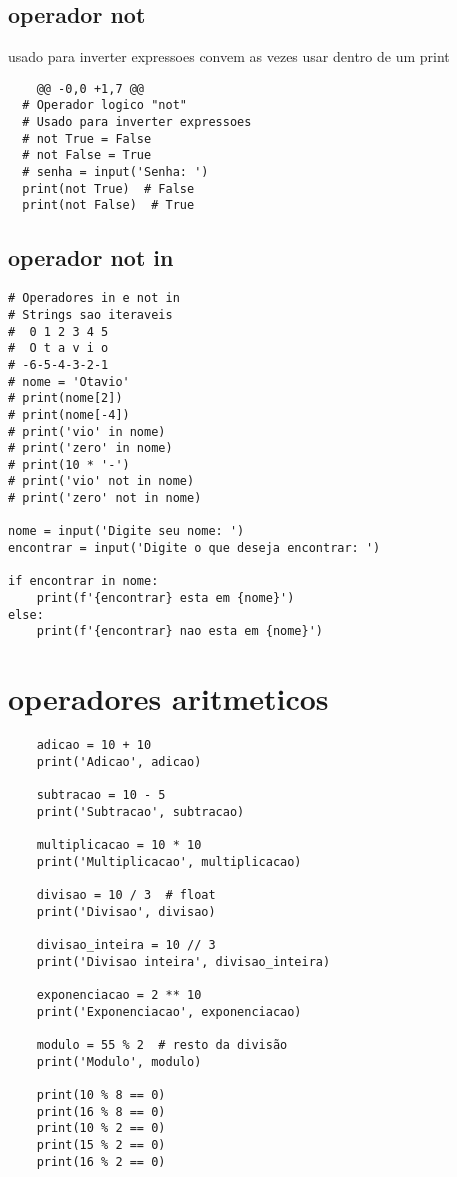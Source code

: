 \documentclass[16pts]{article}
\begin{document}
  \subsection{operador not}
  usado para inverter expressoes convem as vezes usar dentro de um print 
  \begin{lstlisting}
    @@ -0,0 +1,7 @@
  # Operador logico "not"
  # Usado para inverter expressoes
  # not True = False
  # not False = True
  # senha = input('Senha: ')
  print(not True)  # False
  print(not False)  # True
  \end{lstlisting} 
  \subsection{operador not in}
\begin{lstlisting}
# Operadores in e not in
# Strings sao iteraveis
#  0 1 2 3 4 5
#  O t a v i o
# -6-5-4-3-2-1
# nome = 'Otavio'
# print(nome[2])
# print(nome[-4])
# print('vio' in nome)
# print('zero' in nome)
# print(10 * '-')
# print('vio' not in nome)
# print('zero' not in nome)

nome = input('Digite seu nome: ')
encontrar = input('Digite o que deseja encontrar: ')

if encontrar in nome:
    print(f'{encontrar} esta em {nome}')
else:
    print(f'{encontrar} nao esta em {nome}')
\end{lstlisting}
\section{operadores aritmeticos}
  \begin{lstlisting}
    adicao = 10 + 10
    print('Adicao', adicao)
    
    subtracao = 10 - 5
    print('Subtracao', subtracao)
    
    multiplicacao = 10 * 10
    print('Multiplicacao', multiplicacao)
    
    divisao = 10 / 3  # float
    print('Divisao', divisao)
    
    divisao_inteira = 10 // 3
    print('Divisao inteira', divisao_inteira)
    
    exponenciacao = 2 ** 10
    print('Exponenciacao', exponenciacao)
    
    modulo = 55 % 2  # resto da divisão
    print('Modulo', modulo)
    
    print(10 % 8 == 0)
    print(16 % 8 == 0)
    print(10 % 2 == 0)
    print(15 % 2 == 0)
    print(16 % 2 == 0)
  \end{lstlisting}
\end{document}
